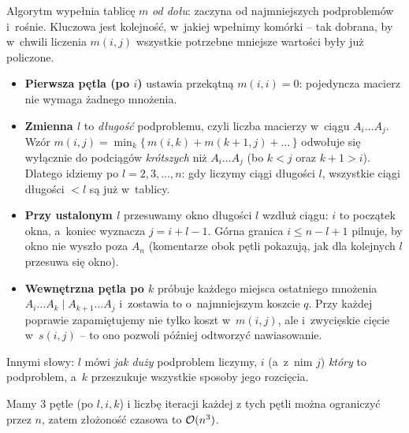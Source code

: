 \begin{dygresja}
	Algorytm wypełnia tablicę $m$ \emph{od dołu}: zaczyna od najmniejszych podproblemów i~rośnie. Kluczowa jest kolejność, w~jakiej wpełnimy komórki -- tak dobrana, by w~chwili liczenia $m(i, j)$ wszystkie potrzebne mniejsze wartości były już policzone.
	\begin{itemize}
		\item \textbf{Pierwsza pętla (po $i$)} ustawia przekątną $m(i, i) = 0$: pojedyncza macierz nie wymaga żadnego mnożenia.
		\item \textbf{Zmienna $l$} to \emph{długość} podproblemu, czyli liczba macierzy w~ciągu $A_i \dots A_j$. Wzór $m(i, j) = \min_k \{\,m(i, k) + m(k{+}1, j) + \dots\,\}$ odwołuje się wyłącznie do podciągów \emph{krótszych} niż $A_i \dots A_j$ (bo $k < j$ oraz $k + 1 > i$). Dlatego idziemy po $l = 2, 3, \dots, n$: gdy liczymy ciągi długości $l$, wszystkie ciągi długości $< l$ są już w~tablicy.
		\item \textbf{Przy ustalonym $l$} przesuwamy okno długości $l$ wzdłuż ciągu: $i$ to początek okna, a~koniec wyznacza $j = i + l - 1$. Górna granica $i \leq n - l + 1$ pilnuje, by okno nie wyszło poza $A_n$ (komentarze obok pętli pokazują, jak dla kolejnych $l$ przesuwa się okno).
		\item \textbf{Wewnętrzna pętla po $k$} próbuje każdego miejsca ostatniego mnożenia $A_i \dots A_k \mid A_{k+1} \dots A_j$ i~zostawia to o~najmniejszym koszcie $q$. Przy każdej poprawie zapamiętujemy nie tylko koszt w~$m(i, j)$, ale i~zwycięskie cięcie w~$s(i, j)$ -- to ono pozwoli później odtworzyć nawiasowanie.
	\end{itemize}
	Innymi słowy: $l$ mówi \emph{jak duży} podproblem liczymy, $i$ (a~z~nim $j$) \emph{który} to podproblem, a~$k$ przeszukuje wszystkie sposoby jego rozcięcia.
\end{dygresja}

Mamy 3 pętle (po $l, i, k$) i liczbę iteracji każdej z tych pętli można ograniczyć przez $n$, zatem złożoność czasowa to $\mathcal{O}(n^3)$.

